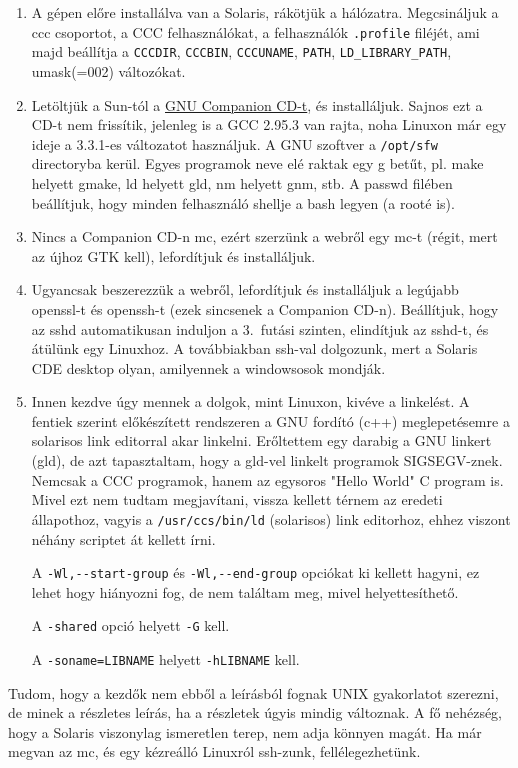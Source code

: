 \begin{enumerate}
\item 
    A gépen előre installálva van a Solaris,
    rákötjük a hálózatra.
    Megcsináljuk a ccc csoportot, a CCC felhasználókat,
    a felhasználók \verb!.profile! filéjét, ami majd
    beállítja a 
    \verb!CCCDIR!, 
    \verb!CCCBIN!, 
    \verb!CCCUNAME!,
    \verb!PATH!, 
    \verb!LD_LIBRARY_PATH!, 
    umask(=002) változókat.
\item
    Letöltjük a Sun-tól a  
    \href{http://wwws.sun.com/software/solaris/freeware/download.html}{GNU Companion CD-t}, 
    és  installáljuk.
    Sajnos ezt a CD-t nem frissítik, jelenleg is a GCC 2.95.3 van rajta, 
    noha Linuxon már egy ideje a 3.3.1-es változatot használjuk.
    A GNU szoftver a \verb!/opt/sfw! directoryba kerül. 
    Egyes programok neve elé raktak egy g betűt, 
    pl. make helyett gmake, 
    ld helyett gld,
    nm helyett gnm, 
    stb.
    A passwd filében beállítjuk, hogy minden felhasználó 
    shellje a bash legyen (a rooté is).
\item
    Nincs a Companion CD-n mc, ezért
    szerzünk a webről egy mc-t (régit, mert az újhoz GTK kell),
    lefordítjuk és installáljuk.
\item 
    Ugyancsak beszerezzük a webről, lefordítjuk és installáljuk 
    a legújabb     openssl-t és openssh-t (ezek sincsenek a Companion CD-n). 
    Beállítjuk, hogy az sshd automatikusan induljon a 3.\ futási szinten, 
    elindítjuk az sshd-t, és átülünk egy Linuxhoz. A továbbiakban
    ssh-val dolgozunk, mert a Solaris CDE desktop olyan, 
    amilyennek a windowsosok mondják.
\item
    Innen kezdve úgy mennek a dolgok, mint Linuxon,
    kivéve a linkelést. A fentiek szerint előkészített rendszeren
    a GNU fordító (c++) meglepetésemre a solarisos link editorral 
    akar linkelni.   Erőltettem egy darabig a GNU linkert (gld), 
    de azt tapasztaltam, hogy a gld-vel linkelt programok 
    SIGSEGV-znek. Nemcsak a CCC programok, hanem az egysoros
    "Hello World" C program is.
    Mivel ezt nem tudtam megjavítani, vissza kellett
    térnem az eredeti állapothoz, vagyis a \verb!/usr/ccs/bin/ld! 
    (solarisos) link editorhoz, ehhez viszont néhány scriptet 
    át kellett írni.
    
    A \verb!-Wl,--start-group! és \verb!-Wl,--end-group! 
    opciókat ki kellett hagyni, ez lehet hogy hiányozni fog,
    de nem találtam meg, mivel helyettesíthető.
    
    A \verb!-shared! opció helyett \verb!-G! kell.
    
    A \verb!-soname=LIBNAME!  helyett \verb!-hLIBNAME! kell.
\end{enumerate}
Tudom, hogy a kezdők nem ebből a leírásból fognak UNIX
gyakorlatot szerezni, de minek a részletes leírás, 
ha a részletek úgyis mindig változnak.
A fő nehézség, hogy a Solaris viszonylag ismeretlen terep,
nem adja könnyen magát.  Ha már megvan az mc,
és egy kézreálló Linuxról ssh-zunk, fellélegezhetünk.

